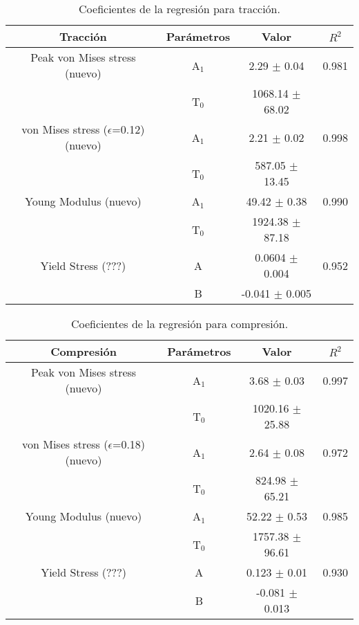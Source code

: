 
\begin{table}[htp]
\caption[Coeficientes de la regresión para tracción.]{Coeficientes de la regresión para tracción.}
\begin{center}
\begin{tabular}{*{4}{c}}
\hline
\textbf{Tracción} & Parámetros & Valor & $R^{2}$ \\ \hline \hline
Peak von Mises stress (nuevo) & A$_{1}$ & 2.29 $\pm$ 0.04 & 0.981 \\
 & T$_{0}$ & 1068.14 $\pm$ 68.02 & \\ \hline
von Mises stress ($\epsilon$=0.12) (nuevo) & A$_{1}$ & 2.21 $\pm$ 0.02 & 0.998 \\
 & T$_{0}$ & 587.05 $\pm$ 13.45 & \\ \hline
Young Modulus (nuevo) & A$_{1}$ & 49.42 $\pm$ 0.38 & 0.990 \\
 & T$_{0}$ & 1924.38 $\pm$ 87.18 & \\ \hline
Yield Stress (???) & A & 0.0604 $\pm$ 0.004 & 0.952 \\
 & B & -0.041 $\pm$ 0.005 & \\ \hline
\end{tabular}
\end{center}
\label{C3:tb:initPropsTen}
\end{table}

\begin{table}[htp]
\caption[Coeficientes de la regresión para compresión.]{Coeficientes de la regresión para compresión.}
\begin{center}
\begin{tabular}{*{4}{c}}
\hline
\textbf{Compresión} & Parámetros & Valor & $R^{2}$ \\ \hline \hline
Peak von Mises stress (nuevo) & A$_{1}$ & 3.68 $\pm$ 0.03 & 0.997 \\
 & T$_{0}$ & 1020.16 $\pm$ 25.88 & \\ \hline
von Mises stress ($\epsilon$=0.18) (nuevo) & A$_{1}$ & 2.64 $\pm$ 0.08 & 0.972 \\
 & T$_{0}$ & 824.98 $\pm$ 65.21 & \\ \hline
Young Modulus (nuevo) & A$_{1}$ & 52.22 $\pm$ 0.53 & 0.985 \\
 & T$_{0}$ & 1757.38 $\pm$ 96.61 & \\ \hline
Yield Stress (???) & A & 0.123 $\pm$ 0.01 & 0.930 \\
 & B & -0.081 $\pm$ 0.013 & \\ \hline
\end{tabular}
\end{center}
\label{C3:tb:initPropsComp}
\end{table}

